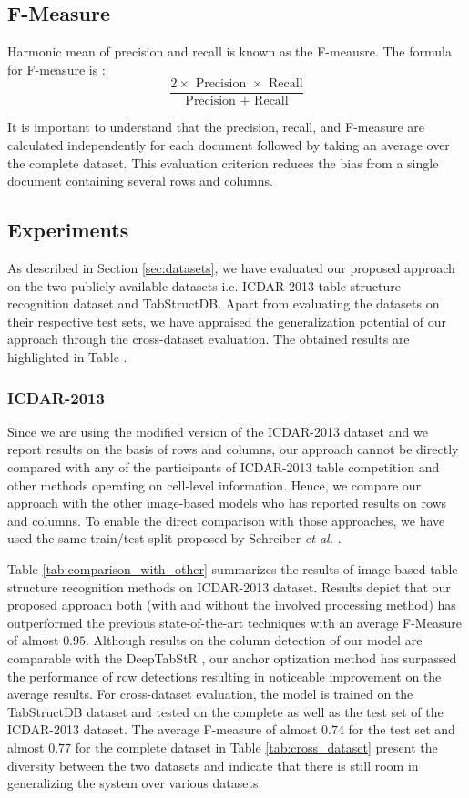 \documentclass{ieeeaccess}
\begin{document}
\subsection{F-Measure}
Harmonic mean of precision and recall is known as the F-meausre. The formula for F-measure is :
\begin{equation}
\frac{\text{$2 \times$ Precision $\times$ Recall}} {\text{Precision $+$ Recall}}
 \end{equation}

It is important to understand that the precision, recall, and F-measure are calculated independently for each document followed by taking an average over the complete dataset. This evaluation criterion reduces the bias from a single document containing several rows and columns.


\subsection{Experiments}

As described in Section \ref{sec:datasets}, we have evaluated our proposed approach on the two publicly available datasets i.e. ICDAR-2013 table structure recognition dataset and TabStructDB. Apart from evaluating the datasets on their respective test sets, we have appraised the generalization potential of our approach through the cross-dataset evaluation. The obtained results are highlighted in Table .


\subsubsection{ICDAR-2013}
Since we are using the modified version of the ICDAR-2013 dataset and we report results on the basis of rows and columns, our approach cannot be directly compared with any of the participants of ICDAR-2013 table competition \cite{b18} and other methods operating on cell-level information.
Hence, we compare our approach with the other image-based models who has reported results on rows and columns. To enable the direct comparison with those approaches, we have used the same train/test split proposed by Schreiber \textit{et al.} \cite{b27}.  


Table \ref{tab:comparison_with_other} summarizes the results of image-based table structure recognition methods on ICDAR-2013 dataset. Results depict that our proposed approach both (with and without the involved processing method) has outperformed the previous state-of-the-art techniques with an average F-Measure of almost $0.95$. Although results on the column detection of our model are comparable with the DeepTabStR \cite{b33}, our anchor optization method has surpassed the performance of row detections resulting in noticeable improvement on the average results. For cross-dataset evaluation, the model is trained on the TabStructDB dataset and tested on the complete as well as the test set of the ICDAR-2013 dataset. The average F-measure of almost $0.74$ for the test set and almost $0.77$ for the complete dataset in Table \ref{tab:cross_dataset} present the diversity between the two datasets and indicate that there is still room in generalizing the system over various datasets.
\end{document}
